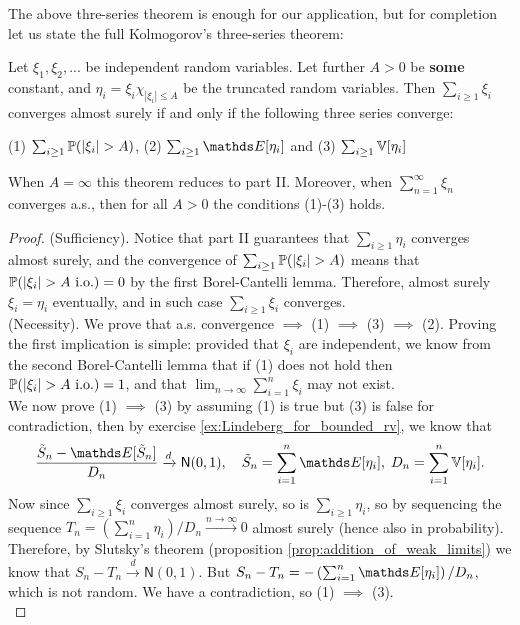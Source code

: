\begin{unexaminable}
The above thre-series theorem is enough for our application, but for completion let us state the full Kolmogorov's three-series theorem:
\begin{corollary} \label{cor:three_series_3}
Let $\xi_1, \xi_2, ...$ be independent random variables. Let further $A>0$ be \textbf{some} constant, and $\eta_i = \xi_i \chi_{|\xi_i| \leq A}$ be the truncated random variables. Then $\sum_{i\geq 1} \xi_i$ converges almost surely if and only if the following three series converge:
\begin{center}
(1) $\sum_{i\geq 1} \mathbb{P}(|\xi_i| > A)$, (2) $\sum_{i\geq 1} \E[\eta_i]$ and (3) $\sum_{i\geq 1} \mathbb{V}[\eta_i]$
\end{center}
When $A = \infty$ this theorem reduces to part II. Moreover, when $\sum_{n=1}^\infty \xi_n$ converges a.s., then for all $A>0$ the conditions (1)-(3) holds.
\end{corollary}

\begin{proof}
(Sufficiency). Notice that part II guarantees that $\sum_{i\geq 1} \eta_i$ converges almost surely, and the convergence of $\sum_{i\geq 1} \mathbb{P}(|\xi_i| > A)$ means that $\mathbb{P}(|\xi_i| > A \text{ i.o.}) = 0$ by the first Borel-Cantelli lemma. Therefore, almost surely $\xi_i = \eta_i$ eventually, and in such case $\sum_{i\geq 1} \xi_i$ converges. \\

(Necessity). We prove that a.s. convergence $\implies$ (1) $\implies$ (3) $\implies$ (2). Proving the first implication is simple: provided that $\xi_i$ are independent, we know from the second Borel-Cantelli lemma that if (1) does not hold then $\p(|\xi_i|>A \text{ i.o.}) = 1$, and that $\lim_{n\to\infty} \sum_{i=1}^n \xi_i$ may not exist.\\

We now prove (1) $\implies$ (3) by assuming (1) is true but (3) is false for contradiction, then by exercise \ref{ex:Lindeberg_for_bounded_rv}, we know that
\begin{equation*}
    \frac{\tilde{S}_n - \E[\tilde{S}_n]}{D_n} \xrightarrow{d} \mathsf{N}(0,1), \quad \tilde{S}_n = \sum_{i=1}^n \E[\eta_i], \; D_n = \sum_{i=1}^n \V[\eta_i].
\end{equation*}
Now since $\sum_{i\geq 1} \xi_i$ converges almost surely, so is $\sum_{i\geq 1} \eta_i$, so by sequencing the sequence $T_n = (\sum_{i=1}^n \eta_i) / D_n \overset{n\to\infty}\to 0$ almost surely (hence also in probability). Therefore, by Slutsky's theorem (proposition \ref{prop:addition_of_weak_limits}) we know that $S_n - T_n \xrightarrow{d} \mathsf{N}(0,1)$. But $S_n - T_n = -\bracket{\sum_{i=1}^n \E[\eta_i]}/D_n$, which is not random. We have a contradiction, so (1) $\implies$ (3). \\


\end{proof}
\end{unexaminable}
